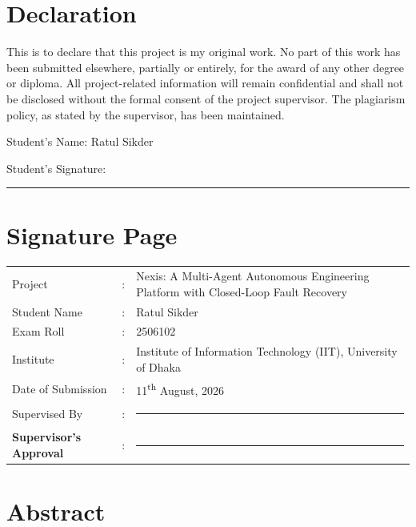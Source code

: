 \documentclass[12pt,oneside]{report}
\begin{document}
\chapter*{Declaration}
This is to declare that this project is my original work. No part of this work
has been submitted elsewhere, partially or entirely, for the award of any other
degree or diploma. All project-related information will remain confidential and
shall not be disclosed without the formal consent of the project supervisor. The
plagiarism policy, as stated by the supervisor, has been maintained.

\vspace{40pt}
Student's Name: Ratul Sikder

\vspace{20pt}
Student's Signature: \rule{6cm}{0.4pt}

\chapter*{Signature Page}
\renewcommand{\arraystretch}{2.2}
\begin{tabular}{@{}p{4.4cm}p{0.4cm}p{9.7cm}@{}}
Project & : & Nexis: A Multi-Agent Autonomous Engineering Platform with Closed-Loop Fault Recovery \\
Student Name & : & Ratul Sikder \\
Exam Roll & : & 2506102 \\
Institute & : & Institute of Information Technology (IIT), University of Dhaka \\
Date of Submission & : & 11\textsuperscript{th} August, 2026 \\
Supervised By & : & \rule{6cm}{0.4pt} \\
\textbf{Supervisor's Approval} & : & \rule{6cm}{0.4pt} \\
\end{tabular}
\renewcommand{\arraystretch}{1}

\chapter*{Abstract}


\tableofcontents
\listoffigures
\listoftables









\end{document}
